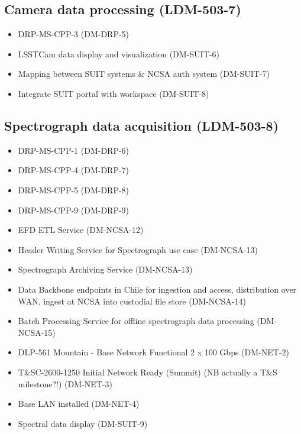 \subsection{Camera data processing \textbf{(LDM-503-7)}\label{LDM-503-7}}
\begin{itemize}
\item DRP-MS-CPP-3		(DM-DRP-5)
\item LSSTCam data display and visualization		(DM-SUIT-6)
\item Mapping between SUIT systems \& NCSA auth system		(DM-SUIT-7)
\item Integrate SUIT portal with workspace		(DM-SUIT-8)
\end{itemize}

\subsection{Spectrograph data acquisition \textbf{(LDM-503-8)}\label{LDM-503-8}}

\begin{itemize}
\item DRP-MS-CPP-1		(DM-DRP-6)
\item DRP-MS-CPP-4		(DM-DRP-7)
\item DRP-MS-CPP-5		(DM-DRP-8)
\item DRP-MS-CPP-9		(DM-DRP-9)
\item EFD ETL Service		(DM-NCSA-12)
\item Header Writing Service for Spectrograph use case		(DM-NCSA-13)
\item Spectrograph Archiving Service		(DM-NCSA-13)
\item Data Backbone endpoints in Chile for ingestion and access, distribution over WAN, ingest at NCSA into custodial file store		(DM-NCSA-14)
\item Batch Processing Service for offline spectrograph data processing		(DM-NCSA-15)
\item DLP-561 Mountain - Base Network Functional 2 x 100 Gbps		(DM-NET-2)
\item T\&SC-2600-1250 Initial Network Ready (Summit) (NB actually a T\&S milestone?!)		(DM-NET-3)
\item Base LAN installed		(DM-NET-4)
\item Spectral data display		(DM-SUIT-9)
\end{itemize}

